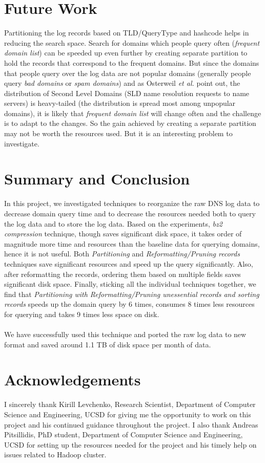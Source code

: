 \documentclass[11pt,a4paper]{article}
\begin{document}
\section{Future Work}
Partitioning the log records based on TLD/QueryType and hashcode helps in reducing the search space. Search for domains which people query often (\textit{frequent domain list}) can be speeded up even further by creating separate partition to hold the records that correspond to the frequent domains. But since the domains that people query over the log data are not popular domains (generally people query \textit{bad domains} or \textit{spam domains}) and as Osterweil \textit{et al.}\cite{uspatent} point out, the distribution of Second Level Domains (SLD name resolution requests to name servers) is heavy-tailed (the distribution is spread most among unpopular domains), it is likely that \textit{frequent domain list} will change often and the challenge is to adapt to the changes. So the gain achieved by creating a separate partition may not be worth the resources used. But it is an interesting problem to investigate.

\section{Summary and Conclusion} 
In this project, we investigated techniques to reorganize the raw DNS log data to decrease domain query time and to decrease the resources needed both to query the log data and to store the log data. Based on the experiments, \textit{bz2 compression} technique, though saves significant disk space, it takes order of magnitude more time and resources than the baseline data for querying domains, hence it is not useful. Both \textit{Partitioning} and \textit{Reformatting/Pruning records} techniques save significant resources and speed up the query significantly. Also, after reformatting the records, ordering them based on multiple fields saves significant disk space. Finally, sticking all the individual techniques together, we find that \textit{Partitioning with Reformatting/Pruning unessential records and sorting records} speeds up the domain query by 6 times, consumes 8 times less resources for querying and takes 9 times less space on disk. 
\\\\
We have successfully used this technique and ported the raw log data to new format and saved around 1.1 TB of disk space per month of data.

\section*{Acknowledgements}
I sincerely thank Kirill Levchenko, Research Scientist, Department of Computer Science and Engineering, UCSD for giving me the opportunity to work on this project and his continued guidance throughout the project. I also thank Andreas Pitsillidis, PhD student, Department of Computer Science and Engineering, UCSD for setting up the resources needed for the project and his timely help on issues related to Hadoop cluster.
\end{document}

